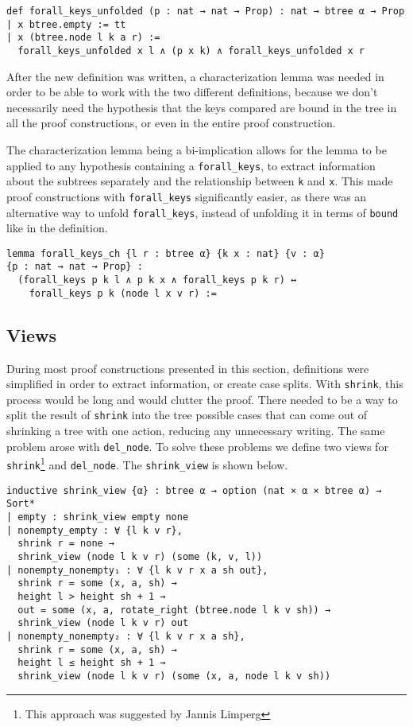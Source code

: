 \begin{lstlisting}
def forall_keys_unfolded (p : nat → nat → Prop) : nat → btree α → Prop
| x btree.empty := tt
| x (btree.node l k a r) :=
  forall_keys_unfolded x l ∧ (p x k) ∧ forall_keys_unfolded x r
\end{lstlisting}

After the new definition was written, a characterization lemma was needed in order to be able to work with the two different definitions, because we don't necessarily need the hypothesis that the keys compared are bound in the tree in all the proof constructions, or even in the entire proof construction.

The characterization lemma being a bi-implication allows for the lemma to be applied to any hypothesis containing a \lstinline{forall_keys}, to extract information about the subtrees separately and the relationship between \lstinline{k} and \lstinline{x}. This made proof constructions with \lstinline{forall_keys} significantly easier, as there was an alternative way to unfold \lstinline{forall_keys}, instead of unfolding it in terms of \lstinline{bound} like in the definition. 

\begin{lstlisting}
lemma forall_keys_ch {l r : btree α} {k x : nat} {v : α} 
{p : nat → nat → Prop} :
  (forall_keys p k l ∧ p k x ∧ forall_keys p k r) ↔ 
    forall_keys p k (node l x v r) :=
\end{lstlisting}

\subsection*{Views}

During most proof constructions presented in this section, definitions were simplified in order to extract information, or create case splits. With \lstinline{shrink}, this process would be long and would clutter the proof. There needed to be a way to split the result of \lstinline{shrink} into the tree possible cases that can come out of shrinking a tree with one action, reducing any unnecessary writing. The same problem arose with \lstinline{del_node}. To solve these problems we define two views for \lstinline{shrink}\footnote{This approach was suggested by Jannis Limperg} and \lstinline{del_node}. The \lstinline{shrink_view} is shown below.

\begin{lstlisting}
inductive shrink_view {α} : btree α → option (nat × α × btree α) → Sort*
| empty : shrink_view empty none
| nonempty_empty : ∀ {l k v r},
  shrink r = none →
  shrink_view (node l k v r) (some (k, v, l))
| nonempty_nonempty₁ : ∀ {l k v r x a sh out},
  shrink r = some (x, a, sh) →
  height l > height sh + 1 →
  out = some (x, a, rotate_right (btree.node l k v sh)) →
  shrink_view (node l k v r) out
| nonempty_nonempty₂ : ∀ {l k v r x a sh},
  shrink r = some (x, a, sh) →
  height l ≤ height sh + 1 →
  shrink_view (node l k v r) (some (x, a, node l k v sh))
\end{lstlisting}

